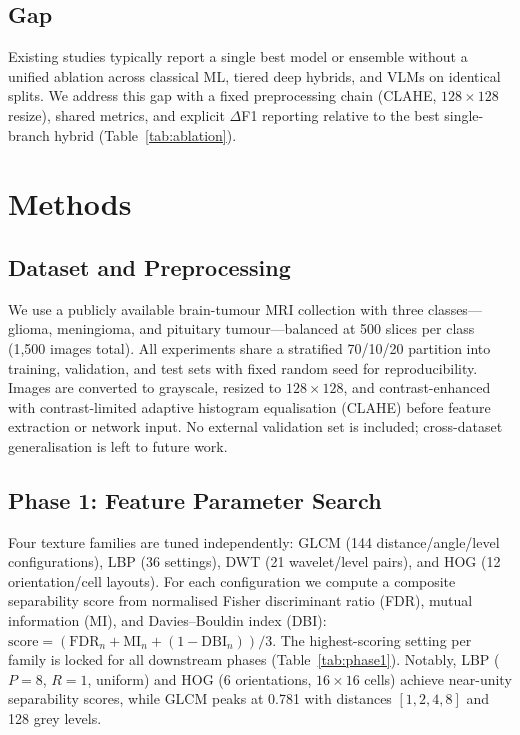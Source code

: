 \documentclass[11pt]{article}
\begin{document}
\subsection{Gap}
Existing studies typically report a single best model or ensemble without a unified ablation across classical ML, tiered deep hybrids, and VLMs on identical splits.
We address this gap with a fixed preprocessing chain (CLAHE, $128\times128$ resize), shared metrics, and explicit $\Delta$F1 reporting relative to the best single-branch hybrid (Table~\ref{tab:ablation}).

\section{Methods}


\subsection{Dataset and Preprocessing}

We use a publicly available brain-tumour MRI collection with three classes---glioma, meningioma, and pituitary tumour---balanced at 500 slices per class (1{,}500 images total).
All experiments share a stratified 70/10/20 partition into training, validation, and test sets with fixed random seed for reproducibility.
Images are converted to grayscale, resized to $128\times128$, and contrast-enhanced with contrast-limited adaptive histogram equalisation (CLAHE) before feature extraction or network input.
No external validation set is included; cross-dataset generalisation is left to future work.

\subsection{Phase 1: Feature Parameter Search}

Four texture families are tuned independently: GLCM (144 distance/angle/level configurations), LBP (36 settings), DWT (21 wavelet/level pairs), and HOG (12 orientation/cell layouts).
For each configuration we compute a composite separability score from normalised Fisher discriminant ratio (FDR), mutual information (MI), and Davies--Bouldin index (DBI):
$\text{score} = (\text{FDR}_n + \text{MI}_n + (1-\text{DBI}_n))/3$.
The highest-scoring setting per family is locked for all downstream phases (Table~\ref{tab:phase1}).
Notably, LBP ($P=8$, $R=1$, uniform) and HOG (6 orientations, $16\times16$ cells) achieve near-unity separability scores, while GLCM peaks at 0.781 with distances $[1,2,4,8]$ and 128 grey levels.
\end{document}
